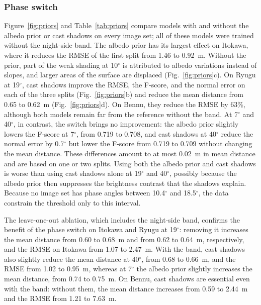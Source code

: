 \documentclass[fleqn,usenatbib]{aa}
\begin{document}
\subsubsection{Phase switch}
\label{sec:rule}

Figure~\ref{fig:priors} and Table~\ref{tab:priors} compare models with and without the albedo prior or cast shadows on
every image set; all of these models were trained without the night-side band. The albedo prior has its largest effect
on Itokawa, where it reduces the RMSE of the first split from 1.46 to 0.92~m. Without the prior, part of the weak
shading at 10$^\circ$ is attributed to albedo variations instead of slopes, and larger areas of the surface are
displaced (Fig.~\ref{fig:priors}c). On Ryugu at 19$^\circ$, cast shadows improve the RMSE, the F-score, and the normal
error on each of the three splits (Fig.~\ref{fig:priors}b) and reduce the mean distance from 0.65 to 0.62~m
(Fig.~\ref{fig:priors}d). On Bennu, they reduce the RMSE by 63\%, although both models remain far from the reference
without the band. At 7$^\circ$ and 40$^\circ$, in contrast, the switch brings no improvement: the albedo prior slightly lowers the
F-score at 7$^\circ$, from 0.719 to 0.708, and cast shadows at 40$^\circ$ reduce the normal error by
0.7$^\circ$ but lower the F-score from 0.719 to 0.709 without changing the mean distance. These differences amount to
at most 0.02~m in mean distance and are based on one or two splits. Using both the albedo prior and cast shadows is
worse than using cast shadows alone at 19$^\circ$ and 40$^\circ$, possibly because the albedo prior then suppresses
the brightness contrast that the shadows explain. Because no image set has phase angles between 10.4$^\circ$ and 18.5$^\circ$, the
data constrain the threshold only to this interval.

The leave-one-out ablation, which includes the night-side band, confirms the benefit of the phase switch on Itokawa
and Ryugu at 19$^\circ$: removing it increases the mean distance from 0.60 to 0.68~m and from 0.62 to 0.64~m,
respectively, and the RMSE on Itokawa from 1.07 to 2.47~m. With the band, cast shadows also slightly reduce the mean
distance at 40$^\circ$, from 0.68 to 0.66~m, and the RMSE from 1.02 to 0.95~m, whereas at 7$^\circ$ the albedo prior
slightly increases the mean distance, from 0.74 to 0.75~m. On Bennu, cast shadows are essential even with the band:
without them, the mean distance increases from 0.59 to 2.44~m and the RMSE from 1.21 to 7.63~m.


\end{document}
